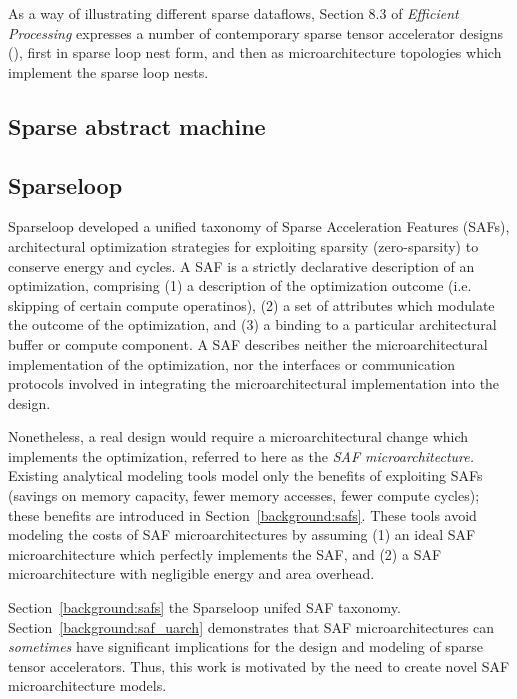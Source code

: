 As a way of illustrating different sparse dataflows, Section 8.3 of \textit{Efficient Processing} expresses a number of contemporary sparse tensor accelerator designs (\cite{cambricon_x}\cite{cnvlutin}\cite{scnn}\cite{sparten}\cite{eyerissv2}\cite{eie}\cite{extensor}), first in sparse loop nest form, and then as microarchitecture topologies which implement the sparse loop nests.

\subsection{Sparse abstract machine}

\subsection{Sparseloop}

Sparseloop\cite{sparseloop} developed a unified taxonomy of Sparse Acceleration Features (SAFs), architectural optimization strategies for exploiting sparsity (zero-sparsity) to conserve energy and cycles. A SAF is a strictly declarative description of an optimization, comprising (1) a description of the optimization outcome (i.e. skipping of certain compute operatinos), (2) a set of attributes which modulate the outcome of the optimization, and (3) a binding to a particular architectural buffer or compute component. A SAF describes neither the microarchitectural implementation of the optimization, nor the interfaces or communication protocols involved in integrating the microarchitectural implementation into the design. 

Nonetheless, a real design would require a microarchitectural change which implements the optimization, referred to here as the \textit{SAF microarchitecture.} Existing analytical modeling tools\cite{sparseloop} model only the benefits of exploiting SAFs (savings on memory capacity, fewer memory accesses, fewer compute cycles); these benefits are introduced in Section~\ref{background:safs}. These tools avoid modeling the costs of SAF microarchitectures by assuming (1) an ideal SAF microarchitecture which perfectly implements the SAF, and (2) a SAF microarchitecture with negligible energy and area overhead.

Section~\ref{background:safs} the Sparseloop unifed SAF taxonomy. Section~\ref{background:saf_uarch} demonstrates that SAF microarchitectures can \textit{sometimes} have significant implications for the design and modeling of sparse tensor accelerators. Thus, this work is motivated by the need to create novel SAF microarchitecture models.


